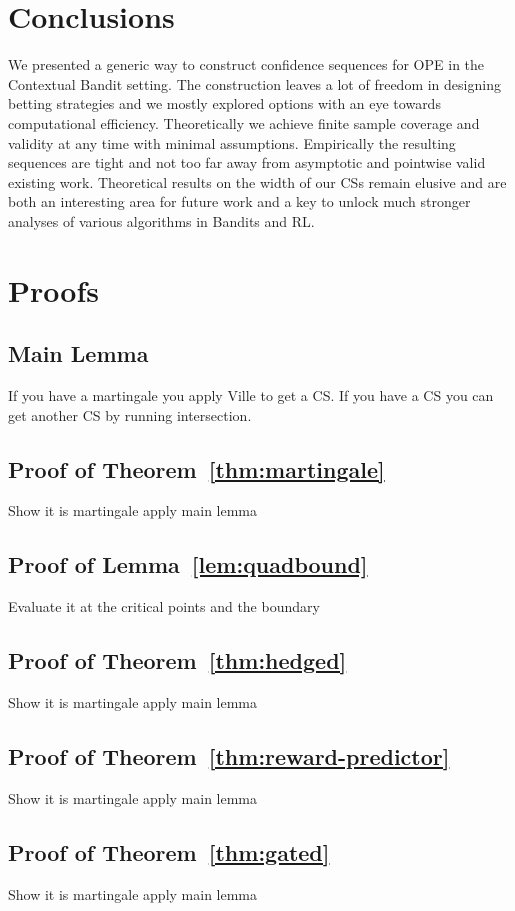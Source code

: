 \section{Conclusions}
We presented a generic way to construct confidence sequences 
for OPE in the Contextual Bandit setting. The construction leaves 
a lot of freedom in designing betting strategies and we mostly 
explored options with an eye towards computational
efficiency. Theoretically we achieve finite sample coverage 
and validity at any time with minimal assumptions. Empirically
the resulting sequences are tight and not too far away from asymptotic 
and pointwise valid existing work. Theoretical results on the 
width of our CSs remain elusive and are both an interesting 
area for future work and a key to unlock much stronger 
analyses of various algorithms in Bandits and RL.



\newpage
\onecolumn
\appendix
\section{Proofs}

\subsection{Main Lemma}
If you have a martingale you apply Ville to get a CS.
If you have a CS you can get another CS by running intersection.
\subsection{Proof of Theorem~\ref{thm:martingale}}
Show it is martingale apply main lemma
\subsection{Proof of Lemma~\ref{lem:quadbound}}
Evaluate it at the critical points and the boundary
\subsection{Proof of Theorem~\ref{thm:hedged}}
Show it is martingale apply main lemma
\subsection{Proof of Theorem~\ref{thm:reward-predictor}}
Show it is martingale apply main lemma
\subsection{Proof of Theorem~\ref{thm:gated}}
Show it is martingale apply main lemma

